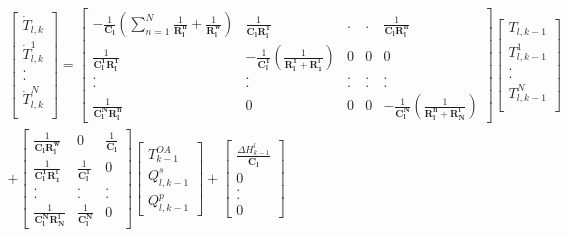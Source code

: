 \begin{equation}
\begin{split}
\begin{bmatrix}
\dot{T}_{l,k} \\
\dot{T}^{1}_{l,k} \\
. \\
. \\
\dot{T}^{N}_{l,k} \\
\end{bmatrix}
=
\begin{bmatrix}
-\frac{1}{\bm{C_l}} ( \sum_{n=1}^N \frac{1}{\bm{R_l^n}} + \frac{1}{\bm{R_l^w}}) & \frac{1}{\bm{C_l} \bm{R_l^1}} & . & . & \frac{1}{\bm{C_l} \bm{R_l^n}} \\
\frac{1}{\bm{C_l^1} \bm{R_l^1}} & -\frac{1}{\bm{C^1_l}} ( \frac{1}{\bm{R_l^1} + \bm{R_1^l}}) & 0 & 0 & 0 \\
. & . & . & . & .\\
. & . & . & . & .\\
\frac{1}{\bm{C_l^N} \bm{R_l^n}} & 0 & 0 & 0 & -\frac{1}{\bm{C^N_l}} ( \frac{1}{\bm{R_l^n} + \bm{R_N^l}})
\end{bmatrix}
\begin{bmatrix}
T_{l,k-1} \\
{T}^{1}_{l,k-1} \\
. \\
. \\
{T}^{N}_{l,k-1} \\
\end{bmatrix}
\\ +
\begin{bmatrix}
\frac{1}{\bm{C_l} \bm{R_l^w}} &
0 &
\frac{1}{\bm{C_l}}
\\
\frac{1}{\bm{C_l^1} \bm{R^l_1}} &
\frac{1}{\bm{C_l^1}} &
0 \\
. & . & . \\
. & . & . \\
\frac{1}{\bm{C_l^N} \bm{R^l_N}} &
\frac{1}{\bm{C_l^N}} &
0
\end{bmatrix}
\begin{bmatrix}
T^{OA}_{k-1} \\
Q^s_{l,k-1} \\
Q^p_{l,k-1}
\end{bmatrix}
+
\begin{bmatrix}
\frac{\Delta H^l_{k-1}}{\bm{C_l}} \\
0 \\
. \\
. \\
0
\end{bmatrix}
\end{split} \label{eq:roomtemperature_lns}
\end{equation}

